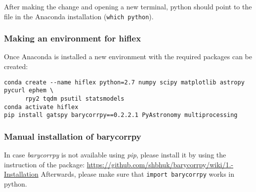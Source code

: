 \documentclass[10pt,a4paper]{article}
\begin{document}
After making the change and opening a new terminal, python should point to the file in the Anaconda installation (\verb|which python|).

\subsubsection{Making an environment for hiflex}
\label{Sec:Creating_conda_environment}
\noindent Once Anaconda is installed a new environment with the required packages can be created:

\begin{lstlisting}[style=base]
conda create --name hiflex python=2.7 numpy scipy matplotlib astropy pycurl ephem \
      rpy2 tqdm psutil statsmodels 
conda activate hiflex
pip install gatspy barycorrpy==0.2.2.1 PyAstronomy multiprocessing
\end{lstlisting}


\subsubsection{Manual installation of barycorrpy }
In case \textit{barycorrpy} is not available using \textit{pip}, please install it by using the instruction of the package: \url{https://github.com/shbhuk/barycorrpy/wiki/1.-Installation}
Afterwards, please make sure that \verb|import barycorrpy| works in python.
\end{document}
